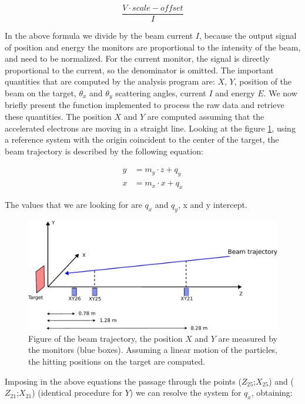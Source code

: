 \begin{appendices}
\begin{equation}
\dfrac{V \cdot scale - offset}{I}
\end{equation}

In the above formula we divide by the beam current $I$, because the output signal of position and energy the monitors are proportional to the intensity of the beam, and need to be normalized. For the current monitor, the signal is directly proportional to the current, so the denominator is omitted.
The important quantities that are computed by the analysis program are: $X$, $Y$, position of the beam on the target, $\theta_{x}$ and $\theta_{y}$ scattering angles, current $I$ and energy $E$. 
We now briefly present the function implemented to process the raw data and retrieve these quantities. \medskip
The position $X$ and $Y$ are computed assuming that the accelerated electrons are moving in a straight line. Looking at the figure \ref{fig:BeamTraje}, using a reference system with the origin coincident to the center of the target, the beam trajectory is described by the following equation:

\begin{align*}
y &= m_{y} \cdot z + q_{y} \\
x &= m_{x} \cdot x + q_{x}
\end{align*}

The values that we are looking for are $q_{x}$ and $q_{y}$, x and y intercept. 

\begin{figure}[hbtp]
\centering
\includegraphics[scale=0.75]{Appendix/scheme.pdf}
\caption{Figure of the beam trajectory, the position $X$ and $Y$ are measured by the monitors (blue boxes). Assuming a linear motion of the particles, the hitting positions on the target are computed.}
\label{fig:BeamTraje}
\end{figure}

Imposing in the above equations the passage through the points ($Z_{25}$;$X_{25}$) and ($Z_{21}$;$X_{21}$) (identical procedure for $Y$) we can resolve the system for $q_{x}$, obtaining:


\end{appendices}
